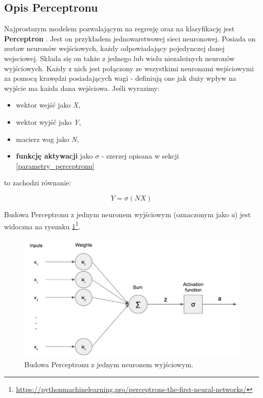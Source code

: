\documentclass[12pt]{aghdpl}
\newenvironment{tightcenter}{
  \setlength\topsep{0pt}
  \setlength\parskip{0pt}
  \begin{center}
}{
  \end{center}
}
\begin{document}
			\subsection{Opis Perceptronu}
			Najprostszym modelem pozwalającym na regresję oraz na klasyfikację jest \textbf{Perceptron} \cite{perceptron_1}\cite{perceptron_2}. Jest on przykładem jednowarstwowej sieci neuronowej. Posiada on zestaw neuronów wejściowych, każdy odpowiadający pojedynczej danej wejsciowej. Składa się on także z jednego lub wielu niezależnych neuronów wyjściowych. Każdy z nich jest połączony ze wszystkimi neuronami wejściowymi za pomocą krawędzi posiadających wagi - definiują one jak duży wpływ na wyjście ma każda dana wejściowa. Jeśli wyrazimy:
			\begin{itemize}
			\item wektor wejść jako \textit{X},
			\item wektor wyjść jako \textit{Y},
			\item macierz wag jako \textit{N},
			\item \textbf{funkcję aktywacji} jako $\sigma$ - szerzej opisana w sekcji \ref{parametry_perceptronu}
			\end{itemize}
			to zachodzi równanie:
			
			\begin{equation}
			Y=\sigma(NX)
			\end{equation}
		
			Budowa Perceptronu z jednym neuronem wyjściowym (oznaczonym jako \textit{a}) jest widoczna na rysunku \ref{fig: budowa_perceptronu}\footnote{\url{https://pythonmachinelearning.pro/perceptrons-the-first-neural-networks/}}.
	
			\begin{figure}[h]
		 		\begin{tightcenter}
		 			\includegraphics[width = 0.75\linewidth]{rysunki/perceptron.png}
				\end{tightcenter}	 			
		 			
	 			\caption{Budowa Perceptronu z jednym neuronem wyjściowym.}
				\label{fig: budowa_perceptronu}
			\end{figure}
\end{document}
